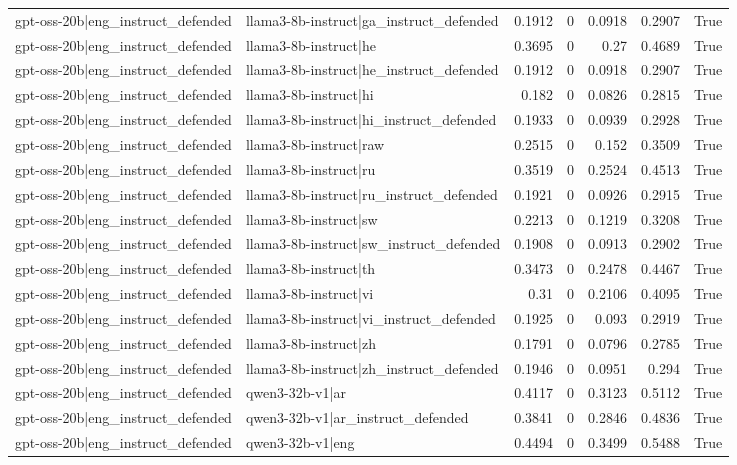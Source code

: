 \begin{table}
\begin{tabular}{l l r r r r l}
gpt-oss-20b|eng_instruct_defended & llama3-8b-instruct|ga_instruct_defended & 0.1912 & 0 & 0.0918 & 0.2907 & True \\
gpt-oss-20b|eng_instruct_defended & llama3-8b-instruct|he & 0.3695 & 0 & 0.27 & 0.4689 & True \\
gpt-oss-20b|eng_instruct_defended & llama3-8b-instruct|he_instruct_defended & 0.1912 & 0 & 0.0918 & 0.2907 & True \\
gpt-oss-20b|eng_instruct_defended & llama3-8b-instruct|hi & 0.182 & 0 & 0.0826 & 0.2815 & True \\
gpt-oss-20b|eng_instruct_defended & llama3-8b-instruct|hi_instruct_defended & 0.1933 & 0 & 0.0939 & 0.2928 & True \\
gpt-oss-20b|eng_instruct_defended & llama3-8b-instruct|raw & 0.2515 & 0 & 0.152 & 0.3509 & True \\
gpt-oss-20b|eng_instruct_defended & llama3-8b-instruct|ru & 0.3519 & 0 & 0.2524 & 0.4513 & True \\
gpt-oss-20b|eng_instruct_defended & llama3-8b-instruct|ru_instruct_defended & 0.1921 & 0 & 0.0926 & 0.2915 & True \\
gpt-oss-20b|eng_instruct_defended & llama3-8b-instruct|sw & 0.2213 & 0 & 0.1219 & 0.3208 & True \\
gpt-oss-20b|eng_instruct_defended & llama3-8b-instruct|sw_instruct_defended & 0.1908 & 0 & 0.0913 & 0.2902 & True \\
gpt-oss-20b|eng_instruct_defended & llama3-8b-instruct|th & 0.3473 & 0 & 0.2478 & 0.4467 & True \\
gpt-oss-20b|eng_instruct_defended & llama3-8b-instruct|vi & 0.31 & 0 & 0.2106 & 0.4095 & True \\
gpt-oss-20b|eng_instruct_defended & llama3-8b-instruct|vi_instruct_defended & 0.1925 & 0 & 0.093 & 0.2919 & True \\
gpt-oss-20b|eng_instruct_defended & llama3-8b-instruct|zh & 0.1791 & 0 & 0.0796 & 0.2785 & True \\
gpt-oss-20b|eng_instruct_defended & llama3-8b-instruct|zh_instruct_defended & 0.1946 & 0 & 0.0951 & 0.294 & True \\
gpt-oss-20b|eng_instruct_defended & qwen3-32b-v1|ar & 0.4117 & 0 & 0.3123 & 0.5112 & True \\
gpt-oss-20b|eng_instruct_defended & qwen3-32b-v1|ar_instruct_defended & 0.3841 & 0 & 0.2846 & 0.4836 & True \\
gpt-oss-20b|eng_instruct_defended & qwen3-32b-v1|eng & 0.4494 & 0 & 0.3499 & 0.5488 & True \\

\end{tabular}
\end{table}
